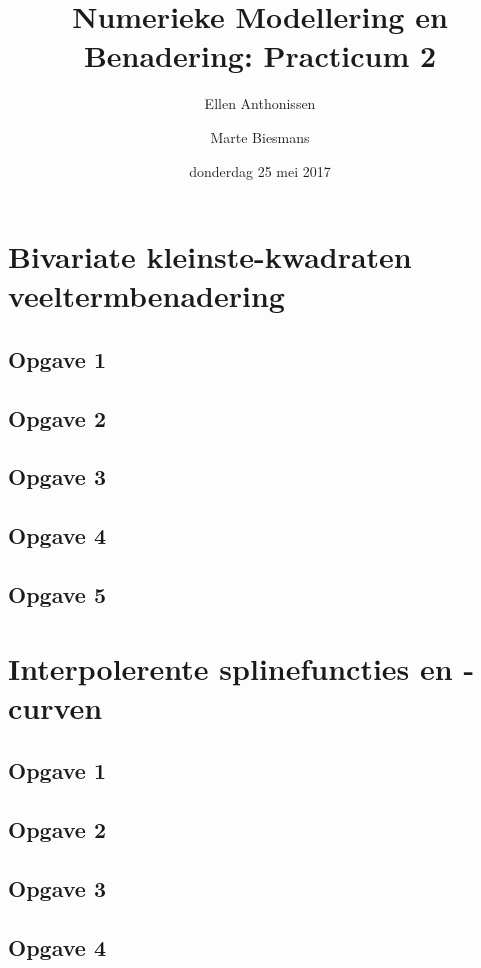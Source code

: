 \documentclass[a4paper]{article}
\title{Numerieke Modellering en Benadering: Practicum 2}
\author{Ellen Anthonissen \and Marte Biesmans}
\date{donderdag 25 mei 2017}
\newcommand{\opgave}[1]{\subsection*{Opgave #1}}
\begin{document}
\maketitle

\section{Bivariate kleinste-kwadraten veeltermbenadering}

\opgave{1}


\opgave{2}


\opgave{3}


\opgave{4}


\opgave{5}


\section{Interpolerente splinefuncties en -curven}

\opgave{1}


\opgave{2}


\opgave{3}


\opgave{4}

\end{document}
